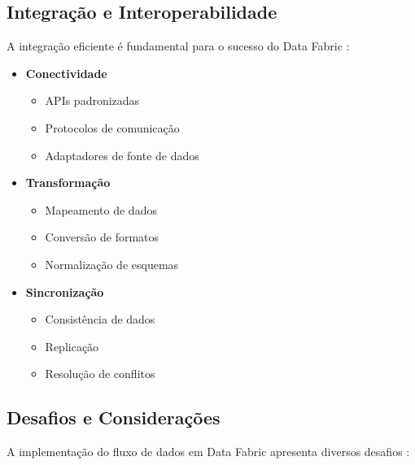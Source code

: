 \subsection{Integração e Interoperabilidade}

A integração eficiente é fundamental para o sucesso do Data Fabric \cite{barik2022data}:

\begin{itemize}
\item \textbf{Conectividade}
\begin{itemize}
\item APIs padronizadas
\item Protocolos de comunicação
\item Adaptadores de fonte de dados
\end{itemize}
\item \textbf{Transformação}
\begin{itemize}
    \item Mapeamento de dados
    \item Conversão de formatos
    \item Normalização de esquemas
\end{itemize}

\item \textbf{Sincronização}
\begin{itemize}
    \item Consistência de dados
    \item Replicação
    \item Resolução de conflitos
\end{itemize}
\end{itemize}

\subsection{Desafios e Considerações}

A implementação do fluxo de dados em Data Fabric apresenta diversos desafios \cite{addagada2022best}:

